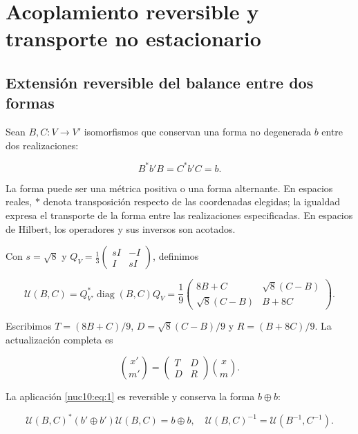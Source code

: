\section{Acoplamiento reversible y transporte no estacionario}
\label{nuclear:10}
\subsection{Extensión reversible del balance entre dos formas}

Sean \(B,C:V\to V'\) isomorfismos que conservan una forma no degenerada \(b\) entre dos realizaciones:



\[
B^*b'B=C^*b'C=b.
\]



La forma puede ser una métrica positiva o una forma alternante. En espacios reales, \(*\) denota transposición respecto de las coordenadas elegidas; la igualdad expresa el transporte de la forma entre las realizaciones especificadas. En espacios de Hilbert, los operadores y sus inversos son acotados.

Con \(s=\sqrt8\) y \(Q_V=\frac13\left(\begin{smallmatrix}sI&-I\\I&sI\end{smallmatrix}\right)\), definimos



\begin{equation}
\boxed{
\mathcal U(B,C)=Q_{V'}^*\operatorname{diag}(B,C)Q_V
=\frac19\begin{pmatrix}8B+C&\sqrt8(C-B)\\\sqrt8(C-B)&B+8C\end{pmatrix}.}
\label{nuc10:eq:1}
\end{equation}



Escribimos \(T=(8B+C)/9\), \(D=\sqrt8(C-B)/9\) y \(R=(B+8C)/9\). La actualización completa es



\begin{equation}
\binom{x'}{m'}=\begin{pmatrix}T&D\\D&R\end{pmatrix}\binom{x}{m}.
\label{nuc10:eq:2}
\end{equation}



\begin{theorem}
La aplicación \eqref{nuc10:eq:1} es reversible y conserva la forma \(b\oplus b\):



\begin{equation}
\mathcal U(B,C)^*(b'\oplus b')\mathcal U(B,C)=b\oplus b,
\quad\mathcal U(B,C)^{-1}=\mathcal U(B^{-1},C^{-1}).
\label{nuc10:eq:3}
\end{equation}
\end{theorem}



